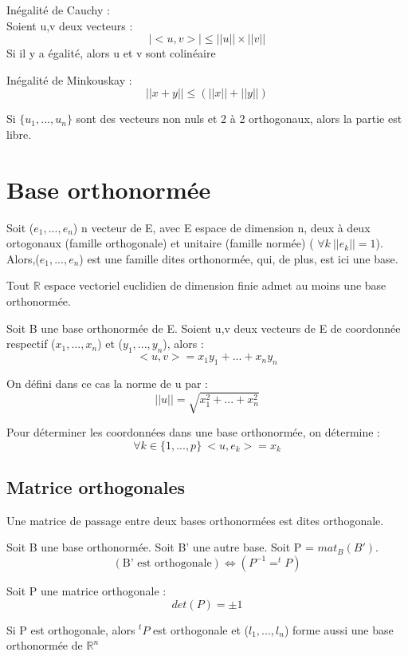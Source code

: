 \begin{prop}
Inégalité de Cauchy : \\
Soient u,v deux vecteurs :
$$|<u,v>| \leq ||u||\times||v||$$
Si il y a égalité, alors u et v sont colinéaire
\end{prop}

\begin{prop}
Inégalité de Minkouskay :
$$||x+y|| \leq (||x||+||y||)$$
\end{prop}
\begin{prop}
Si $\{u_1,...,u_n\}$ sont des vecteurs non nuls et 2 à 2 orthogonaux, alors la partie est libre.
\end{prop}
\section{Base orthonormée}
\begin{de}
Soit ($e_1,...,e_n$) n vecteur de E, avec E espace de dimension n, deux à deux ortogonaux (famille orthogonale) et unitaire (famille normée) ( $\forall k~ ||e_k|| = 1$).\\
Alors,($e_1,...,e_n$) est une famille dites orthonormée, qui, de plus, est ici une base.
\end{de}
\begin{prop}
Tout $\mathbb{R}$ espace vectoriel euclidien de dimension finie admet au moins une base orthonormée.
\end{prop}
\begin{prop}
Soit B une base orthonormée de E. Soient u,v deux vecteurs de E de coordonnée respectif ($x_1,...,x_n$) et ($y_1,...,y_n$), alors :
$$<u,v> = x_1y_1+...+x_ny_n$$
\end{prop}
\begin{prop}
On défini dans ce cas la norme de u par : 
$$||u|| = \sqrt{x_1^2+...+x_n^2}$$
\end{prop}
\begin{prop}
Pour déterminer les coordonnées dans une base orthonormée, on détermine : 
$$\forall k \in \{1,...,p\}~ <u,e_k> = x_k$$
\end{prop}
\subsection{Matrice orthogonales}
\begin{de}
Une matrice de passage entre deux bases orthonormées est dites orthogonale.
\end{de}
\begin{prop}
 Soit B une base orthonormée. Soit B' une autre base. Soit P = $mat_B(B')$.
$$(\mbox{B' est orthogonale}) \Leftrightarrow (P^{-1} = ^tP)$$
\end{prop}
\begin{prop}
Soit P une matrice orthogonale :
$$det(P) = \pm 1$$
\end{prop}
\begin{prop}
Si P est orthogonale, alors $^tP$ est orthogonale et ($l_1,...,l_n$) forme aussi une base orthonormée de $\mathbb{R}^n$
\end{prop}
